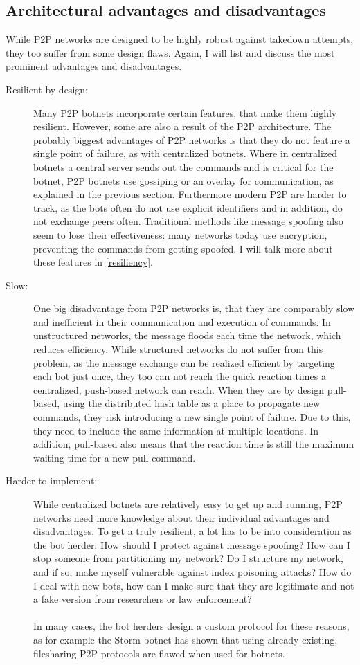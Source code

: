 \documentclass[10pt, a4paper, twocolumn]{article} %
\begin{document}
\subsection{Architectural advantages and disadvantages}
While P2P networks are designed to be highly robust against takedown attempts, they too suffer from some design flaws. Again, I will list and discuss the most prominent advantages and disadvantages.
\begin{description}
\item[Resilient by design:]
Many P2P botnets incorporate certain features, that make them highly resilient. However, some are also a result of the P2P architecture. The probably biggest advantages of P2P networks is that they do not feature a single point of failure, as with centralized botnets. Where in centralized botnets a central server sends out the commands and is critical for the botnet, P2P botnets use gossiping or an overlay for communication, as explained in the previous section. Furthermore modern P2P are harder to track, as the bots often do not use explicit identifiers and in addition, do not exchange peers often. Traditional methods like message spoofing also seem to lose their effectiveness: many networks today use encryption, preventing the commands from getting spoofed. I will talk more about these features in \autoref{resiliency}.

\item[Slow:]
One big disadvantage from P2P networks is, that they are comparably slow and inefficient in their communication and execution of commands. In unstructured networks, the message floods each time the network, which reduces efficiency. While structured networks do not suffer from this problem, as the message exchange can be realized efficient by targeting each bot just once, they too can not reach the quick reaction times a centralized, push-based network can reach. When they are by design pull-based, using the distributed hash table as a place to propagate new commands, they risk introducing a new single point of failure. Due to this, they need to include the same information at multiple locations. In addition, pull-based also means that the reaction time is still the maximum waiting time for a new pull command.   
\item[Harder to implement:]
While centralized botnets are relatively easy to get up and running, P2P networks need more knowledge about their individual advantages and disadvantages. To get a truly resilient, a lot has to be into consideration as the bot herder: How should I protect against message spoofing? How can I stop someone from partitioning my network? Do I structure my network, and if so, make myself vulnerable against index poisoning attacks? How do I deal with new bots, how can I make sure that they are legitimate and not a fake version from researchers or law enforcement?\\\\
In many cases, the bot herders design a custom protocol for these reasons, as for example the Storm botnet has shown that using already existing, filesharing P2P protocols are flawed when used for botnets.
\end{description}
\end{document}
